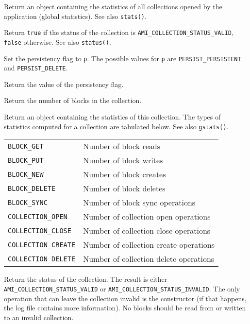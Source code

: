         {Return an object containing the statistics of all collections
        opened by the application (global statistics). See also
        \lstinline|stats()|.}

         {Return \lstinline|true| if the status
        of the collection is \lstinline|AMI_COLLECTION_STATUS_VALID|, \lstinline|false|
        otherwise. See also \lstinline|status()|.}

         {Set the persistency flag to
        \lstinline|p|. The possible values for \lstinline|p| are 
        \lstinline|PERSIST_PERSISTENT| and \lstinline|PERSIST_DELETE|.}

         {Return the value of the 
        persistency flag.}

         {Return the number of blocks in the
        collection.}

        {Return an object containing the statistics of this collection. The
        types of statistics computed for a collection are tabulated
        below. See also \lstinline|gstats()|.\\[1mm] \begin{tabular}{|l|l|} \hline \lstinline|BLOCK_GET| & Number
        of block reads\\ \lstinline|BLOCK_PUT| & Number of block writes \\
        \lstinline|BLOCK_NEW| & Number of block creates\\
        \lstinline|BLOCK_DELETE| & Number of block deletes\\
        \lstinline|BLOCK_SYNC| & Number of block sync operations\\
        \lstinline|COLLECTION_OPEN| & Number of collection open operations\\
        \lstinline|COLLECTION_CLOSE| & Number of collection close
        operations\\ \lstinline|COLLECTION_CREATE| & Number of collection
        create operations\\ \lstinline|COLLECTION_DELETE| & Number of
        collection delete operations\\ \hline \end{tabular} }

         {Return
        the status of the collection. The result is either
        \lstinline|AMI_COLLECTION_STATUS_VALID| or
        \lstinline|AMI_COLLECTION_STATUS_INVALID|. The only operation that
        can leave the collection invalid is the constructor (if that
        happens, the log file contains more information). No blocks should
        be read from or written to an invalid collection.}

